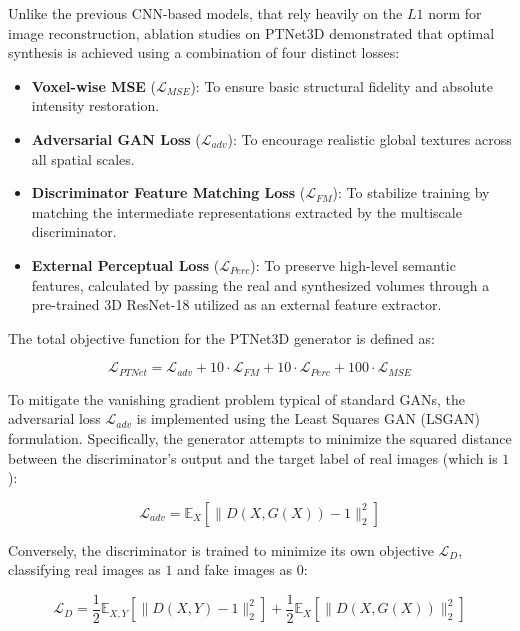 \documentclass[11pt,a4paper]{article}
\begin{document}
Unlike the previous CNN-based models, that rely heavily on the $L1$ norm for image reconstruction, ablation studies on PTNet3D demonstrated that optimal synthesis is achieved using a combination of four distinct losses:
\begin{itemize}
    \item \textbf{Voxel-wise MSE} ($\mathcal{L}_{MSE}$): To ensure basic structural fidelity and absolute intensity restoration.
    \item \textbf{Adversarial GAN Loss} ($\mathcal{L}_{adv}$): To encourage realistic global textures across all spatial scales.
    \item \textbf{Discriminator Feature Matching Loss} ($\mathcal{L}_{FM}$): To stabilize training by matching the intermediate representations extracted by the multiscale discriminator.
    \item \textbf{External Perceptual Loss} ($\mathcal{L}_{Perc}$): To preserve high-level semantic features, calculated by passing the real and synthesized volumes through a pre-trained 3D ResNet-18 utilized as an external feature extractor.
\end{itemize}

The total objective function for the PTNet3D generator is defined as:

\begin{equation}
    \mathcal{L}_{PTNet} = \mathcal{L}_{adv} + 10 \cdot \mathcal{L}_{FM} + 10 \cdot \mathcal{L}_{Perc} + 100 \cdot \mathcal{L}_{MSE}
\end{equation}

To mitigate the vanishing gradient problem typical of standard GANs, the adversarial loss $\mathcal{L}_{adv}$ is implemented using the Least Squares GAN (LSGAN) formulation. Specifically, the generator attempts to minimize the squared distance between the discriminator's output and the target label of real images (which is $1$):

\begin{equation}
    \mathcal{L}_{adv} = \mathbb{E}_{X}\left[\lVert D(X, G(X)) - 1 \rVert_2^2\right]
\end{equation}

Conversely, the discriminator is trained to minimize its own objective $\mathcal{L}_{D}$, classifying real images as $1$ and fake images as $0$:

\begin{equation}
    \mathcal{L}_{D} = \frac{1}{2} \mathbb{E}_{X,Y}\left[\lVert D(X, Y) - 1 \rVert_2^2\right] + \frac{1}{2} \mathbb{E}_{X}\left[\lVert D(X, G(X)) \rVert_2^2\right]
\end{equation}
\end{document}
